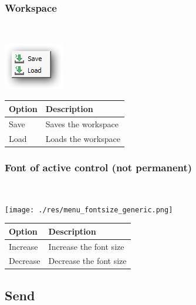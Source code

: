 \hypertarget{menu_r_rterm_workspace}{}
\subsubsection{Workspace}\\

\includegraphics[scale=0.50]{./res/menu_r_rterm_workspace.png}\\

\begin{scriptsize}\begin{tabularx}{\textwidth}{>{\hsize=0.3\hsize}X>{\hsize=0.7\hsize}X}\\
    \hline
    \textbf{Option} & \textbf{Description} \\
    \hline
    Save & Saves the workspace \\
    Load & Loads the workspace \\
    \hline
  \end{tabularx}\end{scriptsize}


\hypertarget{menu_r_rterm_fontsize}{}
\subsubsection{Font of active control (not permanent)}\\

\texttt{[image: ./res/menu\_fontsize\_generic.png]}\\

\begin{scriptsize}\begin{tabularx}{\textwidth}{>{\hsize=0.3\hsize}X>{\hsize=0.7\hsize}X}\\
    \hline
    \textbf{Option} & \textbf{Description} \\
    \hline
    Increase & Increase the font size \\
    Decrease & Decrease the font size \\
    \hline
  \end{tabularx}\end{scriptsize}


\hypertarget{menu_r_send}{}
\subsection{Send}

